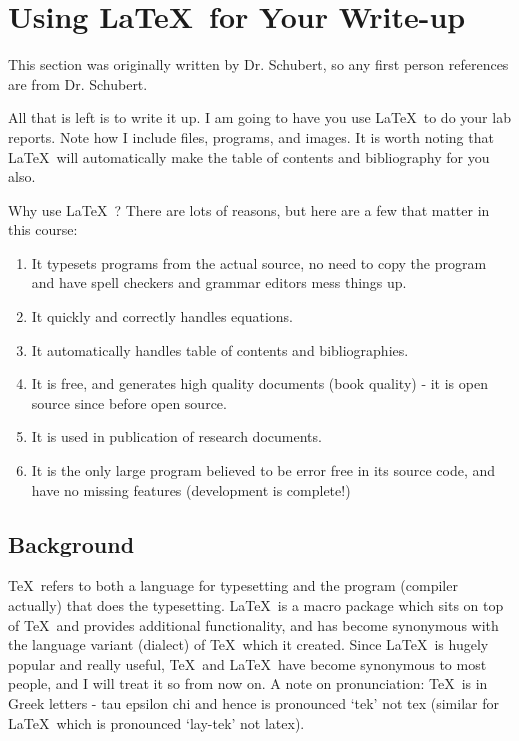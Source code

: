 \section{Using \LaTeX\ for Your Write-up}
This section was originally written by Dr. Schubert, so any first person references are from Dr. Schubert.

All that is left is to write it up.  I am going to have you use \LaTeX\ to do your lab reports. Note how I include files, programs, and images.  It is worth noting that \LaTeX\ will automatically make the table of contents and bibliography for you also.

Why use \LaTeX\ ?  There are lots of reasons, but here are a few that matter in this course:
\begin{enumerate}
\item It typesets programs from the actual source, no need to copy the program and have spell checkers and grammar editors mess things up.
\item It quickly and correctly handles equations.
\item It automatically handles table of contents and bibliographies.
\item It is free, and generates high quality documents (book quality) - it is open source since before open source.
\item It is used in publication of research documents.
\item It is the only large program believed to be error free in its source code, and have no missing features (development is complete!)
\end{enumerate}


\subsection{Background}

\TeX\ refers to both a language for typesetting and the program (compiler actually) that does the typesetting.  \LaTeX\ is a macro package which sits on top of \TeX\ and provides additional functionality, and has become synonymous with the language variant (dialect) of \TeX\ which it created.  Since \LaTeX\ is hugely popular and really useful, \TeX\ and \LaTeX\ have become synonymous to most people, and I will treat it so from now on.  A note on pronunciation: \TeX\ is in Greek letters - tau epsilon chi and hence is pronounced `tek' not tex (similar for \LaTeX\, which is pronounced `lay-tek' not latex).

